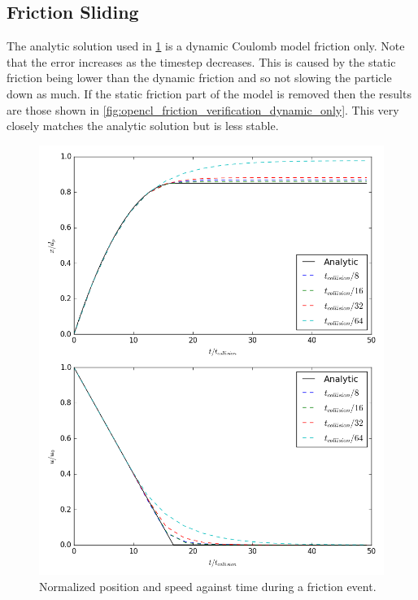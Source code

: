 \documentclass[10pt,a4paper,titlepage]{report}
\begin{document}
\subsection{Friction Sliding}
The analytic solution used in \ref{fig:opencl_friction_verification} is a dynamic Coulomb model friction only. Note that the error increases as the timestep decreases. This is caused by the static friction being lower than the dynamic friction and so not slowing the particle down as much.
If the static friction part of the model is removed then the results are those shown in \ref{fig:opencl_friction_verification_dynamic_only}. This very closely matches the analytic solution but is less stable.
\begin{figure}[!htb]
\centering
\includegraphics[scale=0.5]{figures/opencl_verification/friction_verification.png}
\caption{Normalized position and speed against time during a friction event.}
\label{fig:opencl_friction_verification}
\end{figure}
\end{document}
